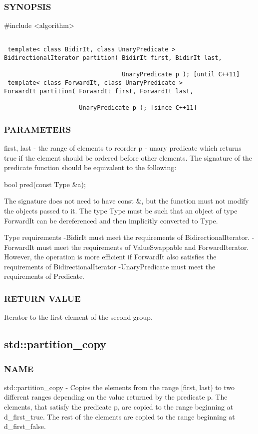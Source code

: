 \subsubsection{SYNOPSIS}
\#include <algorithm>

\begin{lstlisting}

 template< class BidirIt, class UnaryPredicate >
BidirectionalIterator partition( BidirIt first, BidirIt last,

                                 UnaryPredicate p ); [until C++11]
 template< class ForwardIt, class UnaryPredicate >
ForwardIt partition( ForwardIt first, ForwardIt last,

                     UnaryPredicate p ); [since C++11]
\end{lstlisting}

\subsubsection{PARAMETERS}
first, last - the range of elements to reorder
p - unary predicate which returns true  if the element should be ordered before other elements.
The signature of the predicate function should be equivalent to the following:

 bool pred(const Type \&a);

The signature does not need to have const \&, but the function must not modify the objects passed to it.
The type Type must be such that an object of type ForwardIt can be dereferenced and then implicitly converted to Type.

 Type requirements
 -BidirIt must meet the requirements of BidirectionalIterator.
 -ForwardIt must meet the requirements of ValueSwappable and ForwardIterator. However, the operation is more efficient if ForwardIt also satisfies the requirements of BidirectionalIterator
 -UnaryPredicate must meet the requirements of Predicate.

\subsubsection{RETURN VALUE}
Iterator to the first element of the second group.



\subsection{std::partition\_copy}

\subsubsection{NAME}
std::partition\_copy - Copies the elements from the range [first, last) to two different ranges depending on the value returned by the predicate p. The elements, that satisfy the predicate p, are copied to the range beginning at d\_first\_true. The rest of the elements are copied to the range beginning at d\_first\_false.

